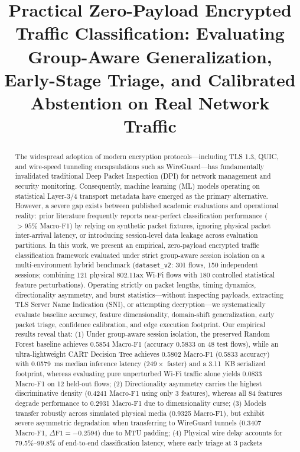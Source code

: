 \documentclass[conference]{IEEEtran}
\begin{document}
\title{Practical Zero-Payload Encrypted Traffic Classification: Evaluating Group-Aware Generalization, Early-Stage Triage, and Calibrated Abstention on Real Network Traffic}

\author{
}

\maketitle

\begin{abstract}
The widespread adoption of modern encryption protocols---including TLS 1.3, QUIC, and wire-speed tunneling encapsulations such as WireGuard---has fundamentally invalidated traditional Deep Packet Inspection (DPI) for network management and security monitoring. Consequently, machine learning (ML) models operating on statistical Layer-3/4 transport metadata have emerged as the primary alternative. However, a severe gap exists between published academic evaluations and operational reality: prior literature frequently reports near-perfect classification performance ($>95\%$ Macro-F1) by relying on synthetic packet fixtures, ignoring physical packet inter-arrival latency, or introducing session-level data leakage across evaluation partitions. In this work, we present an empirical, zero-payload encrypted traffic classification framework evaluated under strict group-aware session isolation on a multi-environment hybrid benchmark (\texttt{dataset\_v2}: 301 flows, 150 independent sessions; combining 121 physical 802.11ax Wi-Fi flows with 180 controlled statistical feature perturbations). Operating strictly on packet lengths, timing dynamics, directionality asymmetry, and burst statistics---without inspecting payloads, extracting TLS Server Name Indication (SNI), or attempting decryption---we systematically evaluate baseline accuracy, feature dimensionality, domain-shift generalization, early packet triage, confidence calibration, and edge execution footprint. Our empirical results reveal that: (1) Under group-aware session isolation, the preserved Random Forest baseline achieves 0.5854 Macro-F1 (accuracy 0.5833 on 48 test flows), while an ultra-lightweight CART Decision Tree achieves 0.5802 Macro-F1 (0.5833 accuracy) with 0.0579~ms median inference latency ($249\times$ faster) and a 3.11~KB serialized footprint, whereas evaluating pure unperturbed Wi-Fi traffic alone yields 0.0833 Macro-F1 on 12 held-out flows; (2) Directionality asymmetry carries the highest discriminative density (0.4241 Macro-F1 using only 3 features), whereas all 84 features degrade performance to 0.2931 Macro-F1 due to dimensionality curse; (3) Models transfer robustly across simulated physical media (0.9325 Macro-F1), but exhibit severe asymmetric degradation when transferring to WireGuard tunnels (0.3407 Macro-F1, $\Delta\text{F1} = -0.2594$) due to MTU padding; (4) Physical wire delay accounts for 79.5\%--99.8\% of end-to-end classification latency, where early triage at 3 packets 
\end{abstract}
\end{document}
